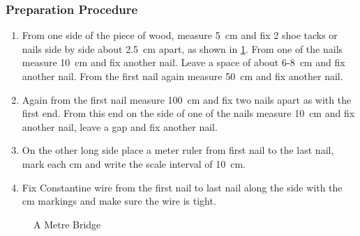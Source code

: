\subsubsection*{Preparation Procedure}
\begin{enumerate}
\item{From one side of the piece of wood, measure 5~cm and fix 2 shoe tacks or nails side by side about 2.5~cm apart, as shown in \ref{fig:metre-bridge}. From one of the nails measure 10~cm and fix another nail. Leave a space of about 6-8~cm and fix another nail. From the first nail again measure 50~cm and fix another nail.} 
\item{Again from the first nail measure 100~cm and fix two nails apart as with the first end. From this end on the side of one of the nails measure 10~cm and fix another nail, leave a gap and fix another nail.} 
\item{On the other long side place a meter ruler from first nail to the last nail, mark each cm and write the scale interval of 10~cm.} 
\item{Fix Constantine wire from the first nail to last nail along the side with the cm markings and make sure the wire is tight.} 
\end{enumerate}

\begin{figure}
\begin{center}
\def\svgwidth{350pt}

\caption{A Metre Bridge}
\label{fig:metre-bridge}
\end{center}
\end{figure}

